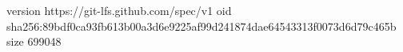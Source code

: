 version https://git-lfs.github.com/spec/v1
oid sha256:89bdf0ca93fb613b00a3d6e9225af99d241874dae64543313f0073d6d79c465b
size 699048
